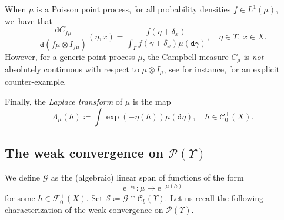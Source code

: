 \documentclass[JEP,XML,SOM,Unicode,published]{cedram}
\theoremstyle{definition}
\theoremstyle{remark}
\begin{document}
When $\mu$ is a Poisson point process, for all probability densities $f \in L^{1}(\mu)$, we~have that
\begin{equation}\label{e:campbell-density}
\frac{\mathtt{d} C_{f\mu}}{\mathtt{d} (f\mu \otimes I_{f\mu})}(\eta, x) = \frac{f(\eta + \delta_{x})}{\int_{\varUpsilon} f(\gamma + \delta_{x}) \mu(\mathtt{d} \gamma)}, \quad \eta \in \varUpsilon,\, x \in X.
\end{equation}
However, for a generic point process $\mu$, the Campbell measure $C_{\mu}$ is \emph{not} absolutely continuous with respect to $\mu \otimes I_{\mu}$, see for instance, \cite{OsadaShirai} for an explicit counter-example.

Finally, the \emph{Laplace transform} of $\mu$ is the map
\begin{equation*}
\Lambda_{\mu}(h) \coloneq \int \exp(- \eta(h)) \mu(\mathtt{d} \eta), \quad h \in \mathscr{C}^{+}_{0}(X).
\end{equation*}

\subsection{The weak convergence \texorpdfstring{on $\mathscr{P}(\varUpsilon)$}{of point processes}}
We define $\mathscr{G}$ as the (algebraic) linear span of functions of the form
\[
\mathrm{e}^{-\iota_{h}}\colon \mu \longmapsto \mathrm{e}^{-\mu(h)}
\]
for some $h \in \mathscr{F}^{+}_{0}(X)$.
Set $\mathscr{S} \coloneq \mathscr{G} \cap \mathscr{C}_{b}(\varUpsilon)$.
Let us recall the following characterization of the weak convergence on $\mathscr{P}(\varUpsilon)$.
\end{document}
